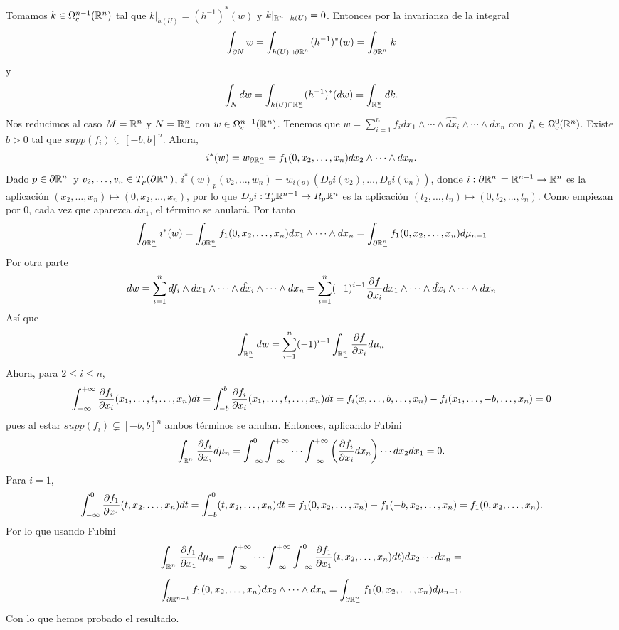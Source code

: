 \documentclass[CV.tex]{subfiles}
\begin{document}
\begin{dem}
Tomamos $k\in\Omega_c^{n-1}(\mathbb{R}^n)$ tal que $k|_{h(U)}= (h^{-1})^*(w)$ y $k|_{\mathbb{R}^n-h(U)}=0$. Entonces por la invarianza de la integral
\[
\int_{\partial N} w=\int_{h(U)\cap \partial \mathbb{R}^n_-} (h^{-1})^*(w)=\int_{\partial\mathbb{R}^n_-} k
\]
y 
\[
\int_N dw=\int_{h(U)\cap\mathbb{R}^n_-}(h^{-1})^*(dw)=\int_{\mathbb{R}^n_-}dk.
\]
Nos reducimos al caso $M=\mathbb{R}^n$ y $N=\mathbb{R}^n_-$ con $w\in\Omega_c^{n-1}(\mathbb{R}^n)$. Tenemos que $w=\sum_{i=1}^n f_i dx_1\land\cdots\land \hat{dx}_i\land\cdots\land dx_n$ con $f_i\in\Omega_c^0(\mathbb{R}^n)$. Existe $b>0$ tal que $supp(f_i)\subsetneq [-b,b]^n$. Ahora, 
\[
i^*(w)=w_{\partial\mathbb{R}^n_-}=f_1(0,x_2,\dots, x_n)dx_2\land\cdots\land dx_n.
\]
Dado $p\in\partial\mathbb{R}^n_-$ y $v_2,\dots, v_n\in T_p(\partial\mathbb{R}^n_-)$, $i^*(w)_p(v_2,\dots, w_n)=w_{i(p)}(D_pi(v_2),\dots, D_pi(v_n))$, donde $i:\partial\mathbb{R}^n_-=\mathbb{R}^{n-1}\to \mathbb{R}^n$ es la aplicación $(x_2,\dots, x_n)\mapsto (0,x_2,\dots, x_n)$, por lo que $D_p i:T_p\mathbb{R}^{n-1}\to R_p\mathbb{R}^n$ es la aplicación $(t_2,\dots, t_n)\mapsto (0,t_2,\dots, t_n)$. Como empiezan por 0, cada vez que aparezca $dx_1$, el término se anulará. Por tanto
\[
\int_{\partial\mathbb{R}^n_-}i^*(w)=\int_{\partial\mathbb{R}^n_-} f_1(0,x_2,\dots, x_n)dx_1\land\cdots\land dx_n=\int_{\partial\mathbb{R}^n_-}f_1(0,x_2,\dots, x_n) d\mu_{n-1}
\]
Por otra parte
\[
dw=\sum_{i=1}^n df_i\land dx_1\land\cdots\land \hat{dx}_i\land\cdots\land dx_n=\sum_{i=1}^n(-1)^{i-1}\frac{\partial f}{\partial x_i}dx_1\land\cdots\land \hat{dx}_i\land\cdots\land dx_n
\]
Así que
\[
\int_{\mathbb{R}^n_-}dw=\sum_{i=1}^n(-1)^{i-1}\int_{\mathbb{R}^n_-}\frac{\partial f}{\partial x_i}d\mu_n
\]
Ahora, para $2\leq i\leq n$, 
\[
\int_{-\infty}^{+\infty}\frac{\partial f_i}{\partial x_i}(x_1, \dots, t,\dots, x_n)dt =\int_{-b}^b\frac{\partial f_i}{\partial x_i}(x_1,\dots, t,\dots, x_n)dt=f_i(x,\dots, b,\dots, x_n)-f_i(x_1,\dots, -b, \dots, x_n)=0
\]
pues al estar $supp(f_i)\subsetneq [-b,b]^n$ ambos términos se anulan. Entonces, aplicando Fubini
\[
\int_{\mathbb{R}^n_-}\frac{\partial f_i}{\partial x_i}d\mu_n=\int_{-\infty}^0\int_{-\infty}^{+\infty}\cdots\int_{-\infty}^{+\infty} \left(\frac{\partial f_i}{\partial x_i}dx_n\right)\cdots dx_2dx_1=0.
\]
Para $i=1$, 
\[
\int_{-\infty}^0\frac{\partial f_1}{\partial x_1}(t,x_2,\dots, x_n)dt=\int_{-b}^0(t,x_2,\dots, x_n)dt=f_1(0,x_2,\dots, x_n)-f_1(-b,x_2,\dots, x_n)=f_1(0,x_2,\dots, x_n).
\]
Por lo que usando Fubini
\[
\int_{\mathbb{R}^n_-}\frac{\partial f_1}{\partial x_1}d\mu_n=\int_{-\infty}^{+\infty}\cdots\int_{-\infty}^{+\infty}\int_{-\infty}^0\frac{\partial f_1}{\partial x_1}(t,x_2,\dots, x_n)dt)dx_2\cdots dx_n=
\]
\[
\int_{\partial\mathbb{R}^{n-1}}f_1(0,x_2,\dots, x_n)dx_2\land\cdots\land dx_n=\int_{\partial\mathbb{R}^n_-}f_1(0,x_2,\dots, x_n)d\mu_{n-1}.
\]
Con lo que hemos probado el resultado.
\QED
\end{dem}
\end{document}
